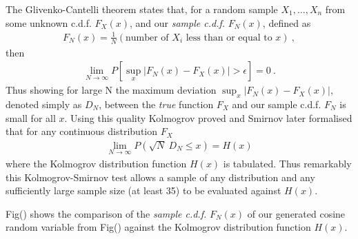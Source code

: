 \documentclass{article}
\begin{document}
The Glivenko-Cantelli theorem states that,
for a random sample  $X_{1},\dots,X_{n}$ from some unknown c.d.f. $F_X(x)$,
and our \textit{sample c.d.f.} $F_N(x)$, defined as 
\begin{align}
F_{N}(x)=\frac{1}{N}(\text{number of $X_{i}$ less than or equal to $x$}) ~,
\end{align}
then
\begin{align}
\lim_{ N \to \infty } P\left[\sup_{x} |F_{N}(x)-F_{X}(x)|>\epsilon\right]  = 0 ~.
\end{align}
Thus showing for large N the maximum deviation
$\sup_{x} |F_{N}(x)-F_{X}(x)|$,
denoted simply as $D_N$, between the \textit{true} function $F_X$ and our sample c.d.f. $F_N$ is small 
for all $x$. 
Using this quality Kolmogrov proved and Smirnov later formalised that for any continuous
distribution $F_X$
\begin{align}
\lim_{ N \to \infty } P(\sqrt{ N }~D_{N}\leq x)=H(x)
\end{align}
where the Kolmogrov distribution function $H(x)$ is tabulated. 
Thus remarkably this Kolmogrov-Smirnov test allows a sample of any distribution and any 
sufficiently large sample size (at least 35) to be evaluated against $H(x)$. \cite{alma9954732790001381}

Fig() shows the comparison of the \textit{sample c.d.f.} $F_N(x)$ of our generated cosine random variable 
from Fig() against the Kolmogrov distribution function $H(x)$.





 
\end{document}
